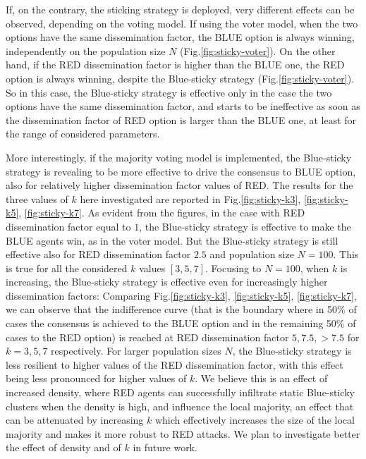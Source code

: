\documentclass[sigconf]{acmart}
\begin{document}
If, on the contrary, the sticking strategy is deployed, very different effects can be observed, depending on the voting model. If using the voter model, when the two options have the same dissemination factor, the BLUE option is always winning,  independently on the population size $N$ (Fig.\ref{fig:sticky-voter}). On the other hand,  if the RED dissemination factor is higher than the BLUE one, the RED option is always winning, despite the Blue-sticky strategy (Fig.\ref{fig:sticky-voter}). So in this case, the Blue-sticky strategy is effective only in the case the two options have the same dissemination factor, and starts to be ineffective as soon as the dissemination factor of RED option is larger than the BLUE one, at least for the range of considered parameters. 

More interestingly, if the majority voting model is implemented, the Blue-sticky strategy is revealing to be more  effective to drive the consensus to BLUE option, also  for relatively higher dissemination factor values of RED. The results for the three values of $k$  here investigated are reported in  Fig.\ref{fig:sticky-k3}, \ref{fig:sticky-k5}, \ref{fig:sticky-k7}. As evident from the figures, in the case with RED dissemination factor equal to $1$, the Blue-sticky strategy is effective to make the BLUE agents win, as in the voter model. But the Blue-sticky strategy is still effective also for RED dissemination factor $2.5$ and  population size $N=100$. This is true for all the considered $k$ values $[3, 5, 7]$. Focusing to $N=100$, when $k$ is increasing, the Blue-sticky strategy is effective even for increasingly higher dissemination factors: Comparing Fig.\ref{fig:sticky-k3}, \ref{fig:sticky-k5}, \ref{fig:sticky-k7}, we can observe that the indifference curve (that is the boundary where in 50\% of cases the consensus  is achieved to the BLUE option and in the remaining 50\% of cases to the RED option) is reached at RED dissemination factor $5, 7.5, >7.5$ for $k=3, 5, 7$ respectively. For larger population sizes $N$, the Blue-sticky strategy is less resilient to higher values of the RED dissemination factor, with this effect being less pronounced for higher values of $k$. We believe this is an effect of increased density, where RED agents can successfully infiltrate static Blue-sticky clusters when the density is high, and influence the local majority, an effect that can be attenuated by increasing $k$ which effectively increases the size of the local majority and makes it more robust to RED attacks. We plan to investigate better the effect of density and of $k$ in future work.
\end{document}
